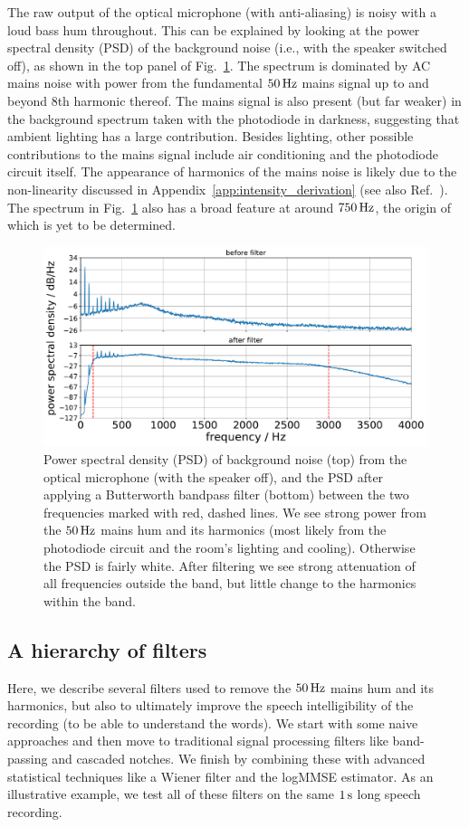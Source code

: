 \documentclass[paper-main.tex]{subfiles}
\begin{document}
The raw output of the optical microphone (with anti-aliasing) is noisy with a loud bass hum throughout. This can be explained by looking at the power spectral density (PSD) of the background noise (i.e., with the speaker switched off), as shown in the top panel of Fig.~\ref{fig:psd_noise}. The spectrum is dominated by AC mains noise with power from the fundamental $50\,{\rm Hz}$ mains signal up to and beyond $8$th harmonic thereof. The mains signal is also present (but far weaker) in the background spectrum taken with the photodiode in darkness, suggesting that ambient lighting has a large contribution. Besides lighting, other possible contributions to the mains signal include air conditioning and the photodiode circuit itself. The appearance of harmonics of the mains noise is likely due to the non-linearity discussed in Appendix~\ref{app:intensity_derivation} (see also Ref.~\cite{feynman}). The spectrum in Fig.~\ref{fig:psd_noise} also has a broad feature at around $750\,{\rm Hz}$, the origin of which is yet to be determined.


\begin{figure}
	\includegraphics[width=.49\textwidth]{figures/psd_butterworth_14_6.pdf}
	\caption{\label{fig:psd_noise}
Power spectral density (PSD) of background noise (top) from the optical microphone (with the speaker off), and the PSD after applying a Butterworth bandpass filter (bottom) between the two frequencies marked with red, dashed lines. 
We see strong power from the $50\,{\rm Hz}$ mains hum and its harmonics (most likely from the photodiode circuit and the room’s lighting and cooling). Otherwise the PSD is fairly white. 
After filtering we see strong attenuation of all frequencies outside the band, but little change to the harmonics within the band.
}
\end{figure}


\subsection{A hierarchy of filters}
\label{sec:filters}

Here, we describe several filters used to remove the $50\,{\rm Hz}$ mains hum and its harmonics, but also to ultimately improve the speech intelligibility of the recording (to be able to understand the words). We start with some naive approaches and then move to traditional signal processing filters like band-passing and cascaded notches. We finish by combining these with advanced statistical techniques like a Wiener filter and the logMMSE estimator. As an illustrative example, we test all of these filters on the same $1\,{\rm s}$ long speech recording.
\end{document}
